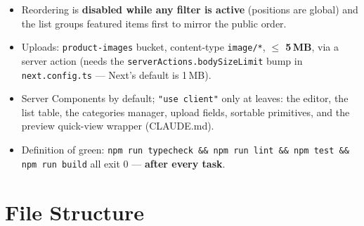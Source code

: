 \documentclass[11pt,a4paper]{article}
\begin{document}
\begin{itemize}
        spec).
  \item Reordering is \textbf{disabled while any filter is active} (positions are global) and the list
        groups featured items first to mirror the public order.
  \item Uploads: \texttt{product-images} bucket, content-type \texttt{image/*}, \textbf{$\leq$ 5\,MB}, via
        a server action (needs the \texttt{serverActions.bodySizeLimit} bump in \texttt{next.config.ts}
        --- Next's default is 1\,MB).
  \item Server Components by default; \texttt{"use client"} only at leaves: the editor, the list table,
        the categories manager, upload fields, sortable primitives, and the preview quick-view wrapper
        (CLAUDE.md).
  \item Definition of green: \texttt{npm run typecheck \&\& npm run lint \&\& npm test \&\& npm run
        build} all exit 0 --- \textbf{after every task}.
\end{itemize}

\section{File Structure}
\end{document}
